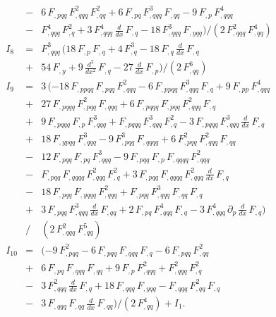 \begin{appendix}
\begin{eqnarray}
\nonumber \\&-& 6\,F_{,pqq}\,F_{,qqq}^{2}\,F_{,qq}^{2} 
+ 6\,F_{,pq}\,F_{,qqq}^{3}\,F_{,qq} - 9\,F_{,p}\,F_{,qqq}^{4} \nonumber \\
&-& F_{,qqq}^{4}\,F_{,q}^{2} 
+3\,F_{,qqq}^{4}\,\frac{d}{dx}\,F_{,q} - 18\,F_{,qqq}^{3}\,F_{,yqq})
/(2\,F_{,qqq}^{2}\,F_{,qq}^{4}) \\
%
\label{BeI8}
I_{8}&=&F_{,qqq}^{3}\,(18\,F_{,p}\,F_{,q} + 4\,F_{,q}^{3} 
- 18\,F_{,q}\,\frac{d}{dx}\,F_{,q} 
\nonumber \\&+& 54\,F_{,y} + 9\,\frac{d^{2}}{dx^{2}}\,F_{,q} 
- 27\,\frac{d}{dx}\,F_{,p})/(2\,F_{,qq}^{6}) \\
%
\label{BeI9}
I_{9}&=&3\,( - 18\,F_{,ppqq}\,F_{,pqq}\,F_{,qqq}^{2} 
- 6\,F_{,ppqq}\,F_{,qqq}^{3}\,F_{,q} + 9\,F_{,pp}\,F_{,qqq}^{4} 
\nonumber \\&+& 27\,F_{,pqqq}\,F_{,pqq}^{2}\,F_{,qqq} 
+ 6\,F_{,pqqq}\,F_{,pqq}\,F_{,qqq}^{2}\,F_{,q} 
\nonumber \\&+& 9\,F_{,pqqq}\,F_{,p}\,F_{,qqq}^{3} 
+F_{,pqqq}\,F_{,qqq}^{3}\,F_{,q}^{2} 
- 3\,F_{,pqqq}\,F_{,qqq}^{3}\,\frac{d}{dx}\,F_{,q} 
\nonumber \\&+& 18\,F_{,ypqq}\,F_{,qqq}^{3} 
- 9\,F_{,pqq}^{3}\,F_{,qqqq} + 6\,F_{,pqq}^{2}\,F_{,qqq}^{2}\,F_{,qq} 
\nonumber \\&-&12\,F_{,pqq}\,F_{,pq}\,F_{,qqq}^{3} 
- 9\,F_{,pqq}\,F_{,p}\,F_{,qqqq}\,F_{,qqq}^{2} \nonumber \\
&-& F_{,pqq}\,F_{,qqqq}\,F_{,qqq}^{2}\,F_{,q}^{2} 
+ 3\,F_{,pqq}\,F_{,qqqq}\,F_{,qqq}^{2}\,\frac{d}{dx}\,F_{,q} \nonumber \\
&-& 18\,F_{,pqq}\,F_{,yqqq}\,F_{,qqq}^{2} 
+ F_{,pqq}\,F_{,qqq}^{3}\,F_{,qq}\,F_{,q} \nonumber \\
&+& 3\,F_{,pqq}\,F_{,qqq}^{3}\,\frac{d}{dx}\,F_{,qq} 
+ 2\,F_{,pq}\,F_{,qqq}^{4}\,F_{,q} 
- 3\,F_{,qqq}^{4}\,\partial_{p}\,\frac{d}{dx}\,F_{,q}) \nonumber \\
&/&(2\,F_{,qqq}^{2}\,F_{,qq}^{5}) \\
%
\label{BeI10}
I_{10}&=&( - 9\,F_{,pqq}^{2} - 6\,F_{,pqq}\,F_{,qqq}\,F_{,q}
- 6\,F_{,pqq}\,F_{,qq}^{2} \nonumber \\
&+& 6\,F_{,pq}\,F_{,qqq}\,F_{,qq} + 9\,F_{,p}\,F_{,qqq}^{2} 
+ F_{,qqq}^{2}\,F_{,q}^{2} \nonumber \\
&-& 3\,F_{,qqq}^{2}\,\frac{d}{dx}\,F_{,q} + 18\,F_{,qqq}\,F_{,yqq} 
- F_{,qqq}\,F_{,qq}^{2}\,F_{,q} \nonumber \\
&-&3\,F_{,qqq}\,F_{,qq}\,\frac{d}{dx}\,F_{,qq})/(2\,F_{,qq}^{4})+I_{1}.
\end{eqnarray}
\end{appendix}

